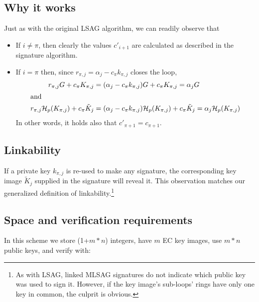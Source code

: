 \subsection*{Why it works}

Just as with the original LSAG algorithm, we can readily observe that

\begin{itemize}

\item If \(i \ne \pi \), then clearly the values \(c'_{i + 1}\) are calculated as described in the signature algorithm.

\item If \(i = \pi\) then, since \(r_{\pi, j} = \alpha_j - c_\pi k_{\pi, j} \) closes the loop,\\
\begin{alignat*}{6}  
  r_{\pi, j} G + c_\pi K_{\pi,j} &= (\alpha_j - c_\pi k_{\pi, j}) G + c_\pi K_{\pi,j} = \alpha_j G \\  
    \intertext{and}
  r_{\pi, j} \mathcal{H}_p(K_{\pi, j}) + c_\pi \tilde{K}_j &= (\alpha_j - c_\pi k_{\pi, j}) \mathcal{H}_p(K_{\pi, j}) + c_\pi \tilde{K}_j = \alpha_j \mathcal{H}_p(K_{\pi, j})\\ 
\end{alignat*}
   In other words, it holds also that \(c'_{\pi + 1} = c_{\pi+1}\).

\end{itemize}


\subsection*{Linkability}

If a private key \(k_{\pi, j}\) is re-used to make any signature, the corresponding key image \(\tilde{K}_j\) supplied in the signature will reveal it. This observation matches our generalized definition of linkability.\footnote{As with LSAG, linked MLSAG signatures do not indicate which public key was used to sign it. However, if the key image's sub-loops' rings have only one key in common, the culprit is obvious.}


\subsection*{Space and verification requirements}

In this scheme we store (1+$m*n$) integers, have $m$ EC key images, use $m*n$ public keys, and verify with:

